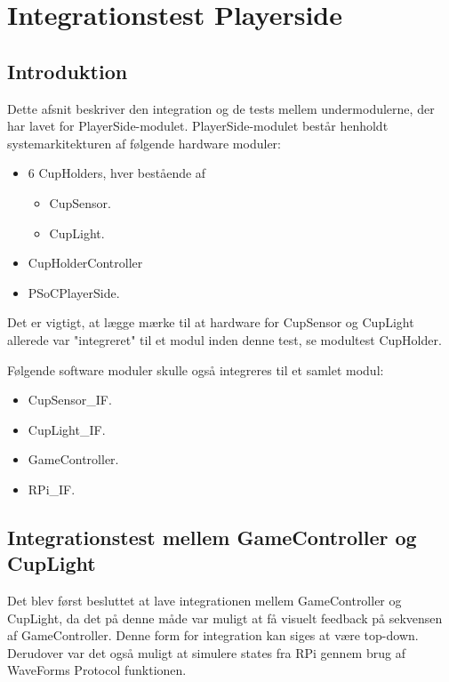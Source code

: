 \documentclass[Integrationstest/Integrationstest_main.tex]{subfiles}
\begin{document}
\section{Integrationstest Playerside}\label{sec:integration_playerside}
\subsection{Introduktion}
Dette afsnit beskriver den integration og de tests mellem undermodulerne, der har lavet for PlayerSide-modulet. PlayerSide-modulet består henholdt systemarkitekturen af følgende hardware moduler:
\begin{itemize}
    \item 6 CupHolders, hver bestående af 
    \begin{itemize}
        \item CupSensor.
        \item CupLight.
    \end{itemize}
    \item CupHolderController
    \item PSoCPlayerSide.
\end{itemize}
Det er vigtigt, at lægge mærke til at hardware for CupSensor og CupLight allerede var "integreret" til et modul inden denne test, se modultest CupHolder. 

Følgende software moduler skulle også integreres til et samlet modul:
\begin{itemize}
    \item CupSensor\_IF.
    \item CupLight\_IF.
    \item GameController.
    \item RPi\_IF.
\end{itemize}


\subsection{Integrationstest mellem GameController og CupLight}
Det blev først besluttet at lave integrationen mellem GameController og CupLight, da det på denne måde var muligt at få visuelt feedback på sekvensen af GameController. Denne form for integration kan siges at være top-down.  Derudover var det også muligt at simulere states fra RPi gennem brug af WaveForms Protocol funktionen. 
\end{document}
